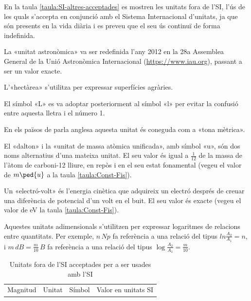 En la taula \vref{taula:SI-altres-acceptades} es mostren les unitats fora de l'SI, l'ús de les quals s'accepta en conjunció amb el Sistema Internacional d'unitats, ja que són presents en la vida diària i es preveu que el seu ús continuï de forma indefinida.

\begin{ThreePartTable}
\begin{TableNotes}
    \item[\color{blue}(a)] {\footnotesize La «unitat astronòmica» va ser redefinida l'any 2012 en la 28a Assemblea General de la Unió Astronòmica Internacional (\href{https://www.iau.org/}{https:/\!\!/www.iau.org}), passant a ser un valor exacte.}
    \item[\color{blue}(b)] {\footnotesize L'«hectàrea» s'utilitza per expressar superfícies agràries.}
    \item[\color{blue}(c)] {\footnotesize El símbol «L» es va adoptar posteriorment al símbol «l» per evitar la  confusió entre aquesta lletra  i  el número 1.}
    \item[\color{blue}(d)] {\footnotesize En els països de parla anglesa aquesta unitat és coneguda com a «tona mètrica».}
    \item[\color{blue}(e)] {\footnotesize El «dalton» i la «unitat de massa atòmica unificada», amb símbol «u»,  són dos noms alternatius d'una mateixa unitat. El seu valor és igual a $\frac{1}{12}$ de la massa de l'àtom de carboni-12 lliure, en repòs i en el seu estat fonamental (vegeu el valor de $m\ped{u}$ a la taula \vref{taula:Const-Fis}).}
    \item[\color{blue}(f)] {\footnotesize Un «electró-volt» és l'energia cinètica que adquireix un electró després de creuar una diferència de potencial d'un volt en el buit. El seu valor és exacte (vegeu el valor de eV la taula \vref{taula:Const-Fis}).}
    \item[\color{blue}(g)] {\footnotesize Aquestes unitats adimensionals s'utilitzen per expressar logaritmes de relacions entre quantitats. Per exemple, $n\unit{\,Np}$ fa referència a una relació del tipus $ln\frac{A_2}{A_1}= n$, i  $ m\unit{\,dB} =\frac{m}{10}\unit{\,B}$  fa referència a una relació del tipus $\log\frac{A_2}{A_1} =\frac{m}{10}$.}
\end{TableNotes}
\begin{longtable}[h]{llcl}
   \caption{\label{taula:SI-altres-acceptades} Unitats fora de l'SI acceptades per a ser usades amb l'SI  }\\
   \toprule[1pt]
    Magnitud & Unitat &  Símbol & Valor en unitats SI\\

\end{longtable}
\end{ThreePartTable}

